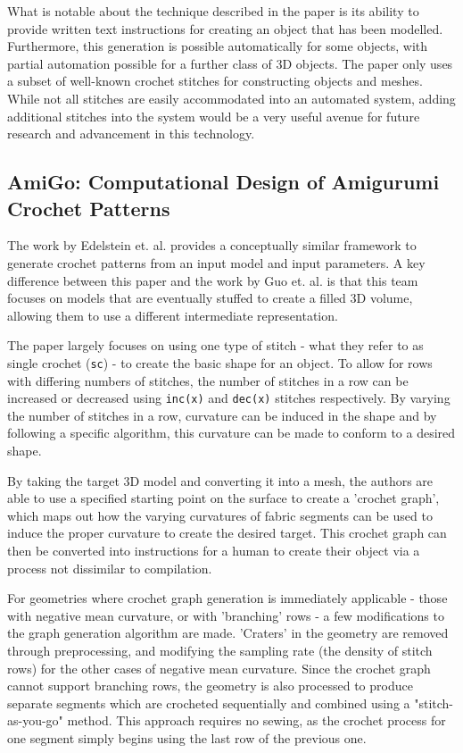 \documentclass{IEEEcsmag}
\begin{document}
What is notable about the technique described in the paper is its ability to
provide written text instructions for creating an object that has been
modelled. Furthermore, this generation is possible automatically for some
objects, with partial automation possible for a further class of 3D objects.
The paper only uses a subset of well-known crochet stitches for constructing
objects and meshes. While not all stitches are easily accommodated into an
automated system, adding additional stitches into the system would be a very
useful avenue for future research and advancement in this technology.

\subsection{AmiGo: Computational Design of Amigurumi Crochet Patterns}

The work by Edelstein et. al. provides a conceptually similar framework to
generate crochet patterns from an input model and input parameters. A key
difference between this paper and the work by Guo et. al. is that this team
focuses on models that are eventually stuffed to create a filled 3D volume,
allowing them to use a different intermediate representation.

The paper largely focuses on using one type of stitch - what they refer to as
single crochet (\verb|sc|) - to create the basic shape for an object. To allow
for rows with differing numbers of stitches, the number of stitches in a row
can be increased or decreased using \verb|inc(x)| and \verb|dec(x)| stitches
respectively. By varying the number of stitches in a row, curvature can be
induced in the shape and by following a specific algorithm, this curvature can
be made to conform to a desired shape.

By taking the target 3D model and converting it into a mesh, the authors are
able to use a specified starting point on the surface to create a 'crochet
graph', which maps out how the varying curvatures of fabric segments can be
used to induce the proper curvature to create the desired target. This crochet
graph can then be converted into instructions for a human to create their
object via a process not dissimilar to compilation.

For geometries where crochet graph generation is immediately applicable - those
with negative mean curvature, or with 'branching' rows - a few modifications to
the graph generation algorithm are made. 'Craters' in the geometry are removed
through preprocessing, and modifying the sampling rate (the density of stitch
rows) for the other cases of negative mean curvature. Since the crochet graph
cannot support branching rows, the geometry is also processed to produce
separate segments which are crocheted sequentially and combined using a
"stitch-as-you-go" method. This approach requires no sewing, as the crochet
process for one segment simply begins using the last row of the previous one.
\end{document}
